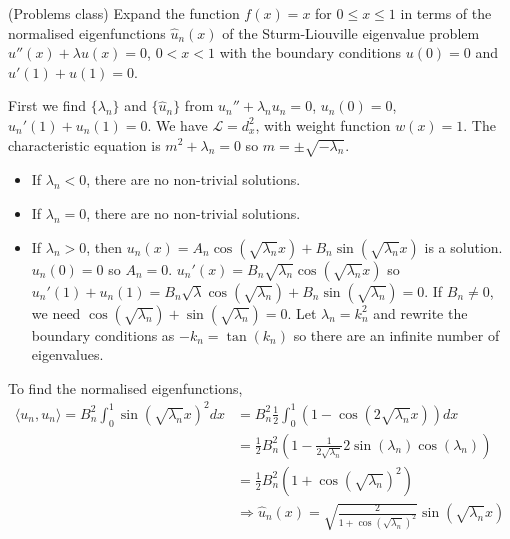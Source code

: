 \begin{example}
	(Problems class) Expand the function $f(x) = x$ for $0 \le x \le 1$ in terms of the normalised eigenfunctions $\hat{u}_n(x)$ of the Sturm-Liouville eigenvalue problem $u''(x) + \lambda u(x) = 0$, $0 < x < 1$ with the boundary conditions $u(0) = 0$ and $u'(1) + u(1) = 0$.

	First we find $\{ \lambda_n \}$ and $\{ \hat{u}_n \}$ from $u_n'' + \lambda_n u_n = 0$, $u_n(0) = 0$, $u_n'(1) + u_n(1) = 0$. We have $\mathcal{L} = d_x^2$, with weight function $w(x) = 1$. The characteristic equation is $m^2 + \lambda_n = 0$ so $m = \pm \sqrt{-\lambda_n}$.
	\begin{itemize}
		\item If $\lambda_n < 0$, there are no non-trivial solutions.
		\item If $\lambda_n = 0$, there are no non-trivial solutions.
		\item If $\lambda_n > 0$, then $u_n(x) = A_n \cos(\sqrt{\lambda_n} x) + B_n \sin(\sqrt{\lambda_n} x)$ is a solution. $u_n(0) = 0$ so $A_n = 0$. $u_n'(x) = B_n \sqrt{\lambda_n} \cos(\sqrt{\lambda_n} x)$ so $u_n'(1) + u_n(1) = B_n \sqrt{\lambda} \cos(\sqrt{\lambda_n}) + B_n \sin(\sqrt{\lambda_n}) = 0$. If $B_n \ne 0$, we need $\cos(\sqrt{\lambda_n}) + \sin(\sqrt{\lambda_n}) = 0$. Let $\lambda_n = k_n^2$ and rewrite the boundary conditions as $-k_n = \tan(k_n)$ so there are an infinite number of eigenvalues.
	\end{itemize}
	To find the normalised eigenfunctions,
	\[
		\begin{aligned}
			\langle u_n, u_n \rangle = B_n^2 \int_{0}^{1} \sin(\sqrt{\lambda_n} x)^2 dx & = B_n^2 \frac{1}{2} \int_{0}^{1} (1 - \cos(2 \sqrt{\lambda_n} x)) dx \\
			& = \frac{1}{2} B_n^2 \left( 1 - \frac{1}{2 \sqrt{\lambda_n}} 2 \sin(\lambda_n) \cos(\lambda_n) \right) \\
			& = \frac{1}{2} B_n^2 (1 + {\cos(\sqrt{\lambda_n})}^2) \\
			& \Longrightarrow \hat{u}_n(x) = \sqrt{\frac{2}{1 + {\cos(\sqrt{\lambda_n})}^2}} \sin(\sqrt{\lambda_n} x)
		\end{aligned}
	\]


\end{example}
